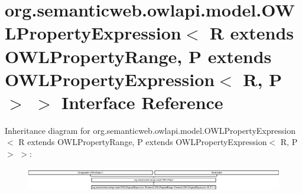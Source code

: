 \hypertarget{interfaceorg_1_1semanticweb_1_1owlapi_1_1model_1_1_o_w_l_property_expression_3_01_r_01extends_0189559738b26c5864733719a0227d2300}{\section{org.\-semanticweb.\-owlapi.\-model.\-O\-W\-L\-Property\-Expression$<$ R extends O\-W\-L\-Property\-Range, P extends O\-W\-L\-Property\-Expression$<$ R, P $>$ $>$ Interface Reference}
\label{interfaceorg_1_1semanticweb_1_1owlapi_1_1model_1_1_o_w_l_property_expression_3_01_r_01extends_0189559738b26c5864733719a0227d2300}
}
Inheritance diagram for org.\-semanticweb.\-owlapi.\-model.\-O\-W\-L\-Property\-Expression$<$ R extends O\-W\-L\-Property\-Range, P extends O\-W\-L\-Property\-Expression$<$ R, P $>$ $>$\-:\begin{figure}[H]
\begin{center}
\leavevmode
\includegraphics[height=1.061947cm]{interfaceorg_1_1semanticweb_1_1owlapi_1_1model_1_1_o_w_l_property_expression_3_01_r_01extends_0189559738b26c5864733719a0227d2300}
\end{center}
\end{figure}
